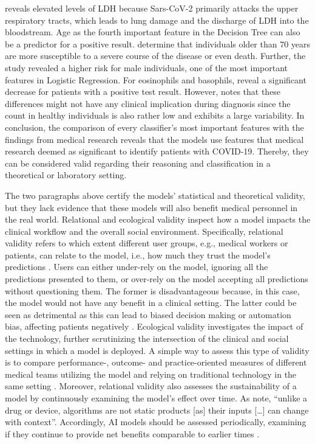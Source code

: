 reveals elevated levels of LDH because Sars-CoV-2 primarily attacks the upper 
respiratory tracts, which leads to lung damage and the discharge of LDH into 
the bloodstream. Age as the fourth important feature in the Decision Tree can 
also be a predictor for a positive result. \citeauthor{RN193} \cite{RN193} 
determine that individuals 
older than 70 years are more susceptible to a severe course of the disease or 
even death. Further, the study revealed a higher risk for male individuals, 
one of the most important features in Logistic Regression.
For eosinophils and basophils, \cite{RN162, RN185} reveal a significant 
decrease for patients with a positive test result. However, \cite{RN162} notes 
that these differences might not have any clinical implication during diagnosis 
since the count in healthy individuals is also rather low and exhibits a large 
variability.
In conclusion, the comparison of every classifier's most important features 
with the findings from medical research reveals that the models use 
features that medical research deemed as significant to identify patients with 
COVID-19. Thereby, they can be considered valid regarding their reasoning and 
classification in a theoretical or laboratory setting.
\par
The two paragraphs above certify the models' statistical and theoretical 
validity, but they lack evidence that these models will also benefit medical 
personnel in the real world. Relational and ecological validity inspect how a 
model impacts the clinical workflow and the overall social environment. 
Specifically, relational validity refers to which extent different user groups, 
e.g., medical workers or patients, can relate to the model, i.e., how much they 
trust the model's predictions \cite{RN151}. Users can either under-rely on 
the model, ignoring all the predictions presented to them, or over-rely on the 
model accepting all predictions without questioning them. The former is 
disadvantageous because, in this case, the model would not have any benefit in 
a clinical setting. The latter could be seen as detrimental as this can lead to 
biased decision making or automation bias, affecting patients 
negatively \cite{RN151, RN152}.
Ecological validity investigates the impact of the technology, further 
scrutinizing the intersection of the clinical and social settings in which a 
model is deployed. A simple way to assess this type of validity is to compare 
performance-, outcome- and practice-oriented measures of different medical 
teams utilizing the model and relying on traditional technology in the same 
setting \cite{RN152}. Moreover, relational validity also assesses the 
sustainability of a model by continuously examining the model's effect 
over time. As \citeauthor{RN198} \cite{RN198} note, ``unlike a drug or device, 
algorithms are not static products [as] their inputs […] can change with 
context''. Accordingly, AI models should be assessed periodically, examining 
if they continue to provide net benefits comparable to earlier times 
\cite{RN152}.
